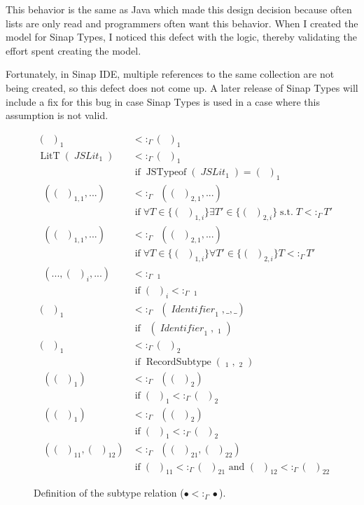 \documentclass[12pt]{article}
\DeclareMathOperator{\LitT}{LitT}
\DeclareMathOperator{\JSLit}{\textit{JSLit}}
\DeclareMathOperator{\JSTypeof}{JSTypeof}
\DeclareMathOperator{\RecT}{RecT_\Gamma}
\DeclareMathOperator{\ObjT}{ObjT_\Gamma}
\DeclareMathOperator{\ListT}{ListT_\Gamma}
\DeclareMathOperator{\SetT}{SetT_\Gamma}
\DeclareMathOperator{\MapT}{MapT_\Gamma}
\DeclareMathOperator{\UnionT}{UnionT_\Gamma}
\DeclareMathOperator{\InterT}{InterT_\Gamma}
\DeclareMathOperator{\Identifier}{\textit{Identifier}}
\DeclareMathOperator{\Type}{{\textit{Type}_\Gamma}}
\DeclareMathOperator{\ObjectSubtype}{ObjectSubtype_\Gamma}
\DeclareMathOperator{\RecordSubtype}{RecordSubtype}
\DeclareMathOperator{\textif}{ if }
\DeclareMathOperator{\suchthat}{s.t.}
\newcommand{\subtype}{<:_\Gamma}
\begin{document}
This behavior is the same as Java which made this design decision 
because often lists are only read and programmers often want
this behavior. When I created the model for Sinap Types,
I noticed this defect with the logic, thereby validating 
the effort spent creating the model. 

Fortunately, in Sinap IDE, multiple references to 
the same collection are not being created,
so this defect does not come up. A later release 
of Sinap Types will include a fix for this bug in 
case Sinap Types is used in a case where this assumption is not
valid.

\newcommand{\stfif}{\\&\textif}

\begin{figure}
\begin{mdframed}        
\begin{align*}
    (\Type)_1&\subtype(\Type)_1 \\
    \LitT(\JSLit_1)&\subtype(\Type)_1 \stfif \JSTypeof(\JSLit_1) = (\Type)_1 \\
    \UnionT((\Type)_{1,1}, ...)&\subtype\UnionT((\Type)_{2,1}, ...) 
    \stfif \forall T\in \{(\Type)_{1,i}\} \exists T' \in \{(\Type)_{2,i}\} \suchthat T\subtype T' \\
    \InterT((\Type)_{1,1}, ...)&\subtype\InterT((\Type)_{2,1}, ...) 
    \stfif \forall T\in \{(\Type)_{1,i}\} \forall T' \in \{(\Type)_{2,i}\} T\subtype T' \\
    \InterT(..., (\Type)_i, ...)&\subtype\ObjT_1 \stfif (\Type)_i\subtype\ObjT_1  \\
    (\Type)_1 &\subtype \ObjT(\Identifier_1, \_, \_) \stfif \ObjectSubtype(\Identifier_1, \ObjT_1)\\
    (\Type)_1&\subtype(\Type)_2 \stfif \RecordSubtype(\RecT_1, \RecT_2) \\
    \ListT((\Type)_1)&\subtype\ListT((\Type)_2) \stfif (\Type)_1\subtype(\Type)_2 \\
    \SetT((\Type)_1)&\subtype\SetT((\Type)_2) \stfif (\Type)_1\subtype(\Type)_2 \\
    \MapT((\Type)_{11}, (\Type)_{12})&\subtype\MapT((\Type)_{21}, (\Type)_{22}) \stfif (\Type)_{11}\subtype(\Type)_{21} \text{ and } (\Type)_{12}\subtype(\Type)_{22} 
\end{align*}
\end{mdframed}        
\caption{Definition of the subtype relation (\(\bullet\subtype\bullet\)).}
\label{subtype-definitions}
\end{figure}
\end{document}
